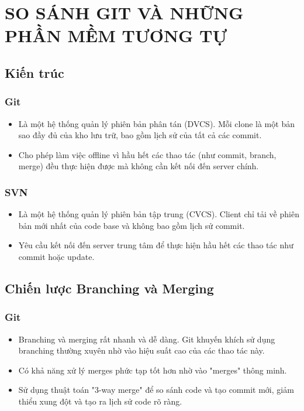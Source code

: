 \chapter{SO SÁNH GIT VÀ NHỮNG PHẦN MỀM TƯƠNG TỰ}
\section{Kiến trúc}
\subsection{Git}
\begin{itemize}
    \item Là một hệ thống quản lý phiên bản phân tán (DVCS). Mỗi clone là một bản sao đầy đủ của kho lưu trữ, bao gồm lịch sử của tất cả các commit.
    \item Cho phép làm việc offline vì hầu hết các thao tác (như commit, branch, merge) đều thực hiện được mà không cần kết nối đến server chính.
\end{itemize}

\subsection{SVN}
\begin{itemize}
    \item Là một hệ thống quản lý phiên bản tập trung (CVCS). Client chỉ tải về phiên bản mới nhất của code base và không bao gồm lịch sử commit.
    \item Yêu cầu kết nối đến server trung tâm để thực hiện hầu hết các thao tác như commit hoặc update.
\end{itemize}

\section{Chiến lược Branching và Merging}
\subsection{Git}
\begin{itemize}
    \item Branching và merging rất nhanh và dễ dàng. Git khuyến khích sử dụng branching thường xuyên nhờ vào hiệu suất cao của các thao tác này.
    \item Có khả năng xử lý merges phức tạp tốt hơn nhờ vào "merges" thông minh.
    \item Sử dụng thuật toán "3-way merge" để so sánh code và tạo commit mới, giảm thiểu xung đột và tạo ra lịch sử code rõ ràng.
\end{itemize}

